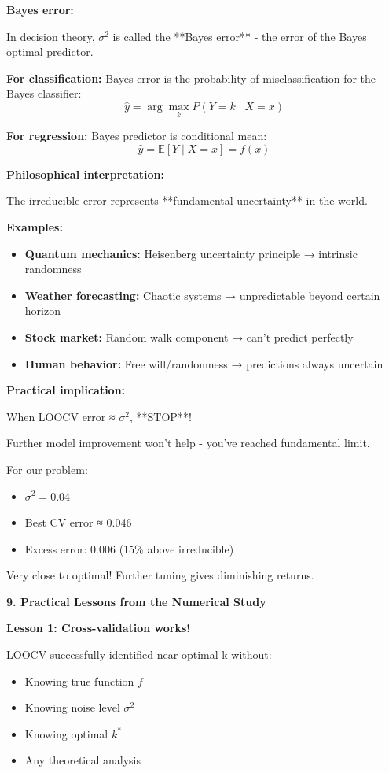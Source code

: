 \documentclass[12pt]{article}
\begin{document}
\begin{explanation}
\textbf{Bayes error:}

In decision theory, $\sigma^2$ is called the **Bayes error** - the error of the Bayes optimal predictor.

\textbf{For classification:} Bayes error is the probability of misclassification for the Bayes classifier:
\[
\hat{y} = \arg\max_k P(Y=k \mid X=x)
\]

\textbf{For regression:} Bayes predictor is conditional mean:
\[
\hat{y} = \mathbb{E}[Y \mid X=x] = f(x)
\]

\textbf{Philosophical interpretation:}

The irreducible error represents **fundamental uncertainty** in the world.

\textbf{Examples:}

\begin{itemize}
    \item \textbf{Quantum mechanics:} Heisenberg uncertainty principle → intrinsic randomness
    \item \textbf{Weather forecasting:} Chaotic systems → unpredictable beyond certain horizon
    \item \textbf{Stock market:} Random walk component → can't predict perfectly
    \item \textbf{Human behavior:} Free will/randomness → predictions always uncertain
\end{itemize}

\textbf{Practical implication:}

When LOOCV error ≈ $\sigma^2$, **STOP**!

Further model improvement won't help - you've reached fundamental limit.

For our problem:
\begin{itemize}
    \item $\sigma^2 = 0.04$
    \item Best CV error ≈ 0.046
    \item Excess error: 0.006 (15\% above irreducible)
\end{itemize}

Very close to optimal! Further tuning gives diminishing returns.

\textbf{9. Practical Lessons from the Numerical Study}

\textbf{Lesson 1: Cross-validation works!}

LOOCV successfully identified near-optimal k without:
\begin{itemize}
    \item Knowing true function $f$
    \item Knowing noise level $\sigma^2$
    \item Knowing optimal $k^*$
    \item Any theoretical analysis
\end{itemize}


\end{explanation}
\end{document}
